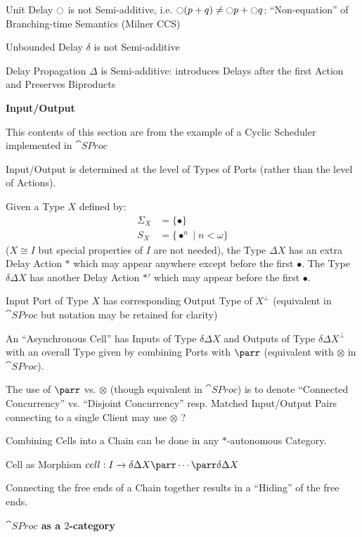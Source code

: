 Unit Delay $\ocircle$ is not Semi-additive, i.e. $\ocircle(p+q) \neq
\ocircle p + \ocircle q$: ``Non-equation'' of Branching-time Semantics
(Milner CCS)

Unbounded Delay $\delta$ is not Semi-additive

Delay Propagation $\Delta$ is Semi-additive: introduces Delays after
the first Action and Preserves Biproducts


\asterism


\textbf{Input/Output}

\fist This contents of this section are from the example of a Cyclic
Scheduler implemented in $\cat{SProc}$ \cite{abramsky-gay-nagarajan96}

Input/Output is determined at the level of Types of Ports (rather than
the level of Actions).

Given a Type $X$ defined by:
\begin{align*}
  \Sigma_X &= \{\bullet\} \\
  S_X &= \{\bullet^n \mid n < \omega \}
\end{align*}
($X \cong I$ but special properties of $I$ are not needed), the Type
$\Delta X$ has an extra Delay Action $*$ which may appear anywhere
except before the first $\bullet$. The Type $\delta\Delta X$ has
another Delay Action $*'$ which may appear before the first $\bullet$.

Input Port of Type $X$ has corresponding Output Type of $X^\bot$
(equivalent in $\cat{SProc}$ but notation may be retained for clarity)

An ``Asynchronous Cell'' has Inputs of Type $\delta\Delta X$ and
Outputs of Type $\delta\Delta X^\bot$ with an overall Type given by
combining Ports with $\parr$ (equivalent with $\otimes$ in
$\cat{SProc}$).

\fist The use of $\parr$ vs. $\otimes$ (though equivalent in
$\cat{SProc}$) is to denote ``Connected Concurrency'' vs. ``Disjoint
Concurrency'' resp. Matched Input/Output Pairs connecting to a single
Client may use $\otimes$ ? %

Combining Cells into a Chain can be done in any $*$-autonomous
Category.

Cell as Morphism $cell : I \rightarrow \delta\Delta X \parr \cdots
\parr \delta\Delta X$

Connecting the free ends of a Chain together results in a ``Hiding''
of the free ends.



\textbf{$\cat{SProc}$ as a $2$-category}

